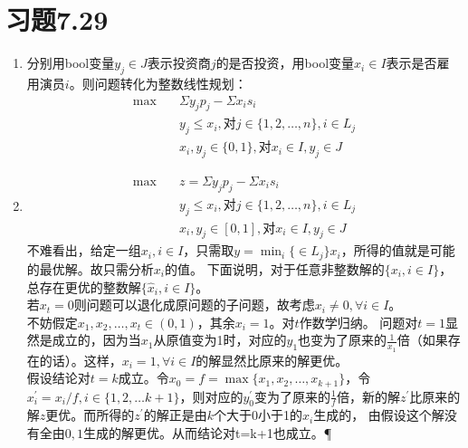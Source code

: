 \documentclass[a4paper,onecolumn,12pt]{article}
\numberwithin{equation}{section}
\begin{document}
\section*{习题7.29}
\begin{enumerate}
  \item 分别用bool变量$y_j\in J$表示投资商$j$的是否投资，用bool变量$x_i\in
  I$表示是否雇用演员$i$。则问题转化为整数线性规划：
\begin{equation*}
\begin{split}
\max \quad&\Sigma y_j p_j-\Sigma x_i s_i\\
& y_j\leq x_i,\text{对}j\in \{1,2,\dots ,n\},i\in L_j\\
& x_i,y_j\in \{0,1\},\text{对}x_i\in I,y_j\in J
\end{split}
\end{equation*}
  \item
  {
  \begin{equation*}
\begin{split}
\max \quad&z=\Sigma y_j p_j-\Sigma x_i s_i\\
& y_j\leq x_i,\text{对}j\in \{1,2,\dots ,n\},i\in L_j\\
& x_i,y_j\in\left[0,1\right],\text{对}x_i\in I,y_j\in J
\end{split}
\end{equation*}
不难看出，给定一组$x_i,i\in I$，只需取$y=\min_i\{\in L_j\}x_i$，所得的值就是可能的最优解。故只需分析$x_i$的值。
下面说明，对于任意非整数解的$\{x_i,i\in I\}$，总存在更优的整数解$\{\hat{x}_i,i\in I\}$。\\
若$x_t=0$则问题可以退化成原问题的子问题，故考虑$x_i\neq 0,\forall i\in I$。\\
不妨假定$x_1,x_2,\ldots,x_t\in(0,1)$，其余$x_i=1$。对$t$作数学归纳。
问题对$t=1$显然是成立的，因为当$x_1$从原值变为1时，对应的$y_1$也变为了原来的$\frac{1}{x_1}$倍（如果存在的话）。这样，$x_i=1,\forall
i\in I$的解显然比原来的解更优。\\
假设结论对$t=k$成立。令$x_0=f=\max\{x_1,x_2,\ldots,x_{k+1}\}$，令$x_i^{\prime}=x_i/f,i\in\{1,2,\ldots
k+1\}$，则对应的$y_0^{\prime}$变为了原来的$\frac{1}{f}$倍，新的解$z^\prime$比原来的解$z$更优。而所得的$z^\prime$的解正是由$k$个大于0小于1的$x_i$生成的，
由假设这个解没有全由$0,1$生成的解更优。从而结论对t=k+1也成立。\P
  } 
\end{enumerate}
\end{document}
